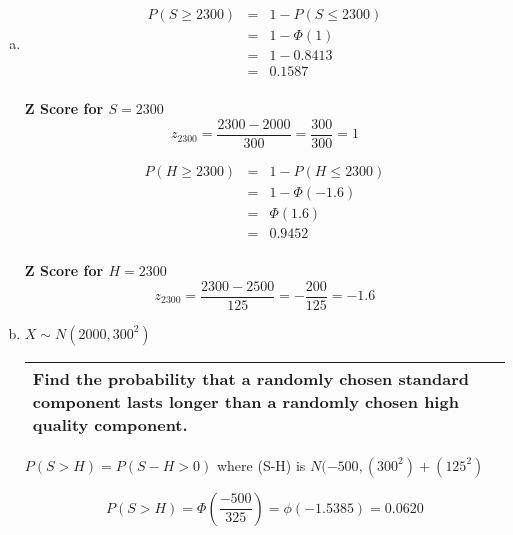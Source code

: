 \documentclass[a4paper,12pt]{article}
\begin{document}
\begin{enumerate}[(a)]
\item
\begin{multicols}{2}
\begin{eqnarray*}
P( S \geq 2300) &=& 1- P (S \leq 2300)\\
&=& 1-\Phi(1)\\
&=& 1- 0.8413 \\
&=& 0.1587 \\
\end{eqnarray*}
\begin{framed}
\noindent \textbf{Z Score for $S = 2300$}
\[z_{2300}  = \frac{2300 - 2000}{ 300}  = \frac{300}{300} = 1\]
\end{framed}
\begin{eqnarray*}
P( H \geq 2300) &=& 1- P (H \leq 2300)\\
&=& 1-\Phi(-1.6)\\
&=& \Phi(1.6) \\
&=& 0.9452 \\
\end{eqnarray*}
\begin{framed}
\noindent \textbf{Z Score for $H = 2300$}
\[z_{2300}  = \frac{2300 - 2500}{125}  = -\frac{200}{125} = -1.6\]
\end{framed}
\end{multicols}


\item  $X \sim N(2000,300^2)$

\begin{table}[ht!]
 \centering
 \begin{tabular}{|p{15cm}|}
 \hline
\noindent  Find the probability that a randomly chosen standard component
lasts longer than a randomly chosen high quality component.
\\ \hline
  \end{tabular}
\end{table}

$P(S >H) = P(S-H>0)$ where (S-H)  is $N(-500, (300^2) + (125^2)$

\[P(S >H) = \Phi\left( \frac{-500}{325} \right) = \phi (-1.5385) = 0.0620\]



\end{enumerate}
\end{document}
